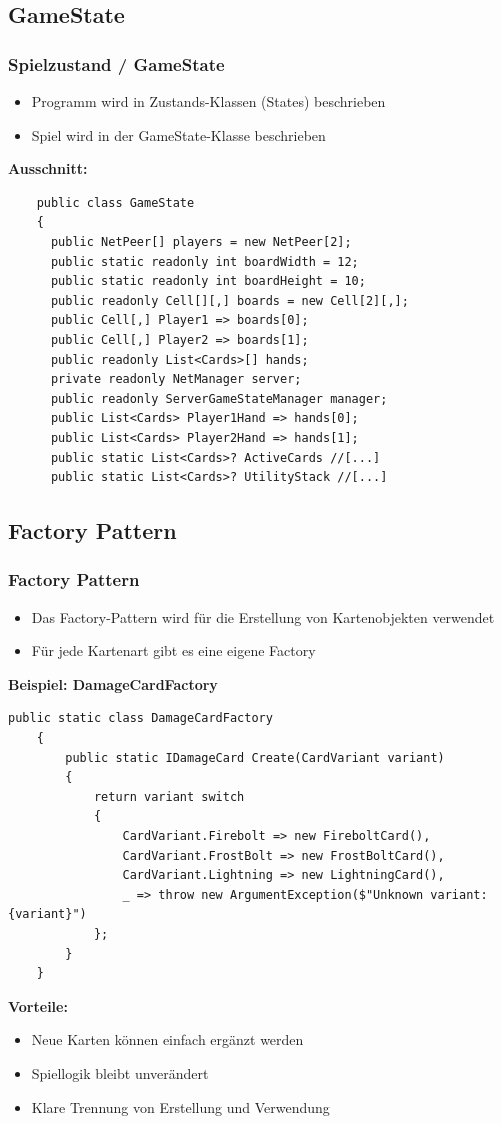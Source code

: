 \documentclass{beamer}
\begin{document}
\subsection{GameState}
\begin{frame}[fragile]
  \frametitle{Spielzustand / GameState}
  \begin{itemize}
    \item Programm wird in Zustands-Klassen (States) beschrieben
    \item Spiel wird in der GameState-Klasse beschrieben
  \end{itemize}
  \textbf{Ausschnitt: }
  \begin{lstlisting}
    public class GameState
    {
      public NetPeer[] players = new NetPeer[2];
      public static readonly int boardWidth = 12;
      public static readonly int boardHeight = 10;
      public readonly Cell[][,] boards = new Cell[2][,];
      public Cell[,] Player1 => boards[0];
      public Cell[,] Player2 => boards[1];
      public readonly List<Cards>[] hands;
      private readonly NetManager server;
      public readonly ServerGameStateManager manager;
      public List<Cards> Player1Hand => hands[0];
      public List<Cards> Player2Hand => hands[1];
      public static List<Cards>? ActiveCards //[...]
      public static List<Cards>? UtilityStack //[...]
  \end{lstlisting}
\end{frame}

\subsection{Factory Pattern}
\begin{frame}[fragile]
\frametitle{Factory Pattern}
  \begin{itemize}
    \item Das Factory-Pattern wird für die Erstellung von Kartenobjekten verwendet
    \item Für jede Kartenart gibt es eine eigene Factory
  \end{itemize}
  
  \textbf{Beispiel: DamageCardFactory}
  \begin{lstlisting}[language=CSharp, basicstyle=\ttfamily\tiny, breaklines=true]
    public static class DamageCardFactory 
    {
        public static IDamageCard Create(CardVariant variant) 
        {
            return variant switch 
            {
                CardVariant.Firebolt => new FireboltCard(),
                CardVariant.FrostBolt => new FrostBoltCard(),
                CardVariant.Lightning => new LightningCard(),
                _ => throw new ArgumentException($"Unknown variant: {variant}")
            };
        }
    }
  \end{lstlisting}
  
  \textbf{Vorteile:}
  \begin{itemize}
    \item Neue Karten können einfach ergänzt werden
    \item Spiellogik bleibt unverändert
    \item Klare Trennung von Erstellung und Verwendung
  \end{itemize}
\end{frame}
\end{document}
